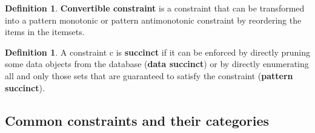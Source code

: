 \documentclass[12pt, openany]{report}
\theoremstyle{definition}
\newtheorem{definition}[thm]{Definition}
\begin{document}
\begin{definition}
    \textbf{Convertible constraint} is a constraint that can be transformed into a pattern monotonic or pattern antimonotonic constraint by reordering the items in the itemsets.
\end{definition}
\begin{definition}
    A constraint c is \textbf{succinct} if it can be enforced by directly pruning some data objects from the database (\textbf{data succinct}) or by directly enumerating all and only those sets that are guaranteed to satisfy the constraint (\textbf{pattern succinct}).
\end{definition}
\subsection{Common constraints and their categories}
\end{document}
